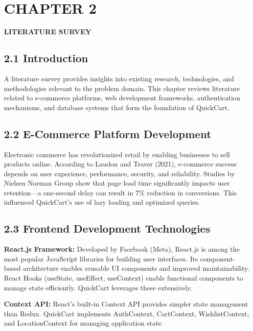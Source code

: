 \documentclass[12pt,a4paper]{report}
\begin{document}
\setcounter{page}{13}

\chapter*{CHAPTER 2}

\begin{center}
    \textbf{\large LITERATURE SURVEY}
\end{center}

\section*{2.1 Introduction}

A literature survey provides insights into existing research, technologies, and methodologies relevant to the problem domain. This chapter reviews literature related to e-commerce platforms, web development frameworks, authentication mechanisms, and database systems that form the foundation of QuickCart.

\section*{2.2 E-Commerce Platform Development}

Electronic commerce has revolutionized retail by enabling businesses to sell products online. According to Laudon and Traver (2021), e-commerce success depends on user experience, performance, security, and reliability. Studies by Nielsen Norman Group show that page load time significantly impacts user retention—a one-second delay can result in 7\% reduction in conversions. This influenced QuickCart's use of lazy loading and optimized queries.

\section*{2.3 Frontend Development Technologies}

\textbf{React.js Framework:} Developed by Facebook (Meta), React.js is among the most popular JavaScript libraries for building user interfaces. Its component-based architecture enables reusable UI components and improved maintainability. React Hooks (useState, useEffect, useContext) enable functional components to manage state efficiently. QuickCart leverages these extensively.

\textbf{Context API:} React's built-in Context API provides simpler state management than Redux. QuickCart implements AuthContext, CartContext, WishlistContext, and LocationContext for managing application state.
\end{document}
